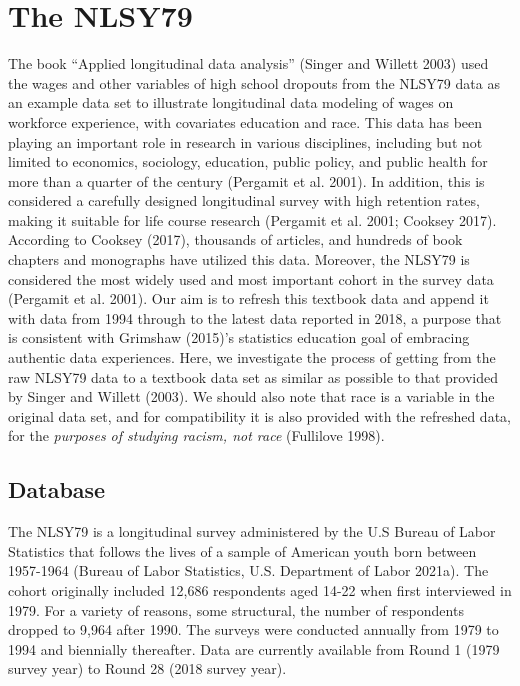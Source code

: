 \documentclass{article}
\begin{document}
\hypertarget{database}{%
\section{The NLSY79}\label{database}}

The book ``Applied longitudinal data analysis'' (Singer and Willett 2003) used the wages and other variables of high school dropouts from the NLSY79 data as an example data set to illustrate longitudinal data modeling of wages on workforce experience, with covariates education and race. This data has been playing an important role in research in various disciplines, including but not limited to economics, sociology, education, public policy, and public health for more than a quarter of the century (Pergamit et al. 2001). In addition, this is considered a carefully designed longitudinal survey with high retention rates, making it suitable for life course research (Pergamit et al. 2001; Cooksey 2017). According to Cooksey (2017), thousands of articles, and hundreds of book chapters and monographs have utilized this data. Moreover, the NLSY79 is considered the most widely used and most important cohort in the survey data (Pergamit et al. 2001).
Our aim is to refresh this textbook data and append it with data from 1994 through to the latest data reported in 2018, a purpose that is consistent with Grimshaw (2015)'s statistics education goal of embracing authentic data experiences. Here, we investigate the process of getting from the raw NLSY79 data to a textbook data set as similar as possible to that provided by Singer and Willett (2003). We should also note that race is a variable in the original data set, and for compatibility it is also provided with the refreshed data, for the \emph{purposes of studying racism, not race} (Fullilove 1998).

\hypertarget{database-1}{%
\subsection{Database}\label{database-1}}

The NLSY79 is a longitudinal survey administered by the U.S Bureau of Labor Statistics that follows the lives of a sample of American youth born between 1957-1964 (Bureau of Labor Statistics, U.S. Department of Labor 2021a). The cohort originally included 12,686 respondents aged 14-22 when first interviewed in 1979. For a variety of reasons, some structural, the number of respondents dropped to 9,964 after 1990. The surveys were conducted annually from 1979 to 1994 and biennially thereafter. Data are currently available from Round 1 (1979 survey year) to Round 28 (2018 survey year).
\end{document}
